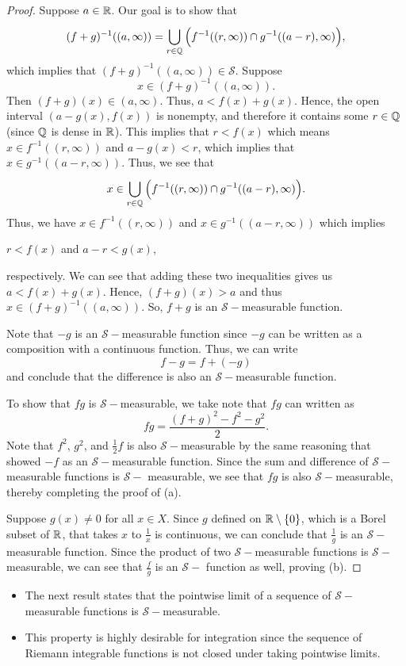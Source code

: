 \documentclass[11pt,a4paper]{book}
\begin{document}
\begin{proof}
Suppose \( a \in \mathbb{R}  \). Our goal is to show that 
\[  (f+g)^{-1} ((a , \infty )) = \bigcup_{ r \in \mathbb{Q}  }^{  }  \Big(  f^{-1}((r, \infty ))  \cap g^{-1}((a-r), \infty ) \Big), \]
which implies that \( (f+g)^{-1}((a,\infty )) \in \mathcal{S} \). Suppose 
\[  x \in (f+g)^{-1}((a,\infty )). \]
Then \( (f+g)(x) \in (a,\infty ) \). Thus, \( a < f(x) + g(x) \). Hence, the open interval \( (a - g(x), f(x))  \) is nonempty, and therefore it contains some \( r \in \mathbb{Q}  \) (since \( \mathbb{Q}  \) is dense in \( \mathbb{R}  \)). This implies that \( r < f(x)  \) which means \( x \in f^{-1}((r,\infty  )) \) and \( a - g(x) < r  \), which implies that \( x \in g^{-1}((a-r,\infty )) \). Thus, we see that
\[ x \in \bigcup_{ r \in \mathbb{Q}  }^{  }  \Big( f^{-1}((r,\infty )) \cap g^{-1}((a-r), \infty ) \Big).  \]
Thus, we have \( x \in f^{-1}((r,\infty )) \) and \( x \in g^{-1}((a-r, \infty )) \) which implies
\begin{center}
    \( r < f(x) \) and \( a - r < g(x) \),
\end{center}
respectively. We can see that adding these two inequalities gives us \( a < f(x) + g(x) \). Hence, \( (f+g)(x) > a  \) and thus \( x \in (f+g)^{-1}((a,\infty )) \). So, \( f + g  \) is an \( \mathcal{S}- \)measurable function. 

Note that \( -g  \) is an \( \mathcal{S}- \)measurable function since \( -g  \) can be written as a composition with a continuous function. Thus, we can write  
\[  f - g  = f + (-g) \]
and conclude that the difference is also an \( \mathcal{S}- \)measurable function.

To show that \( fg  \) is \( \mathcal{S}- \)measurable, we take note that \( fg  \) can written as
\[  fg = \frac{ (f+g)^{2} - f^{2} - g^{2}  }{ 2  }.  \]
Note that \( f^{2}  \), \( g^{2} \), and \( \frac{ 1 }{ 2 } f  \)  is also \( \mathcal{S}- \)measurable by the same reasoning that showed \( -f \) as an \( \mathcal{S}- \)measurable function. Since the sum and difference of \( \mathcal{S}- \)measurable functions is \( \mathcal{S}- \) measurable, we see that \( fg  \) is also \( \mathcal{S}- \)measurable, thereby completing the proof of (a). 

Suppose \( g(x) \neq 0  \) for all \( x \in X  \). Since \( g  \) defined on \( \mathbb{R} \setminus  \{  0  \}  \), which is a Borel subset of \( \mathbb{R}  \), that takes \( x  \) to \( \frac{ 1 }{ x }  \) is continuous, we can conclude that  \( \frac{ 1  }{ g  }  \) is an \( \mathcal{S}- \)measurable function. Since the product of two \( \mathcal{S}- \)measurable functions is \( \mathcal{S}- \)measurable, we can see that \( \frac{ f }{ g }  \) is an \( \mathcal{S}- \) function as well, proving (b). 
\end{proof}
\begin{itemize}
    \item The next result states that the pointwise limit of a sequence of \( \mathcal{S}- \)measurable functions is \( \mathcal{S}- \)measurable. 
    \item This property is highly desirable for integration since the sequence of Riemann integrable functions is not closed under taking pointwise limits.  
\end{itemize}
\end{document}
